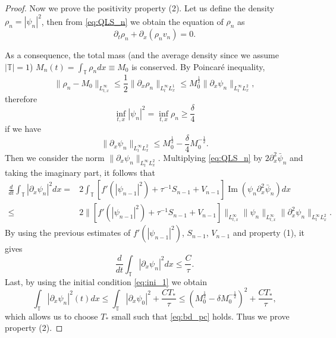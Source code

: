 \documentclass[10pt,a4paper]{amsart}
\DeclareMathOperator{\IM}{Im}
\def\T{{\mathbb T}}%
\def\d{{\partial}}
\begin{document}
\begin{proof}
Now we prove the positivity property (2). Let us define the density $\rho_n=|\psi_n|^2$, then from \eqref{eq:QLS_n} we obtain the equation of $\rho_n$ as
\[
\d_t\rho_n+\d_x (\rho_n v_n)=0.
\]

As a consequence, the total mass (and the average density since we assume $|\T|=1$) $M_n(t)=\int_\T\rho_n dx\equiv M_0$ is conserved. By Poincar\'e inequality,
\begin{equation}\label{eq:poincare}
\|\rho_n-M_0\|_{L^\infty_{t,x}}\leq \frac12\|\d_x\rho_n\|_{L^\infty_tL^1_x}\leq M_0^\frac12\|\d_x\psi_n\|_{L^\infty_tL^2_x},
\end{equation}
therefore 
\[
\inf_{t,x}|\psi_n|^2=\inf_{t,x}\rho_n\geq \frac{\delta}{4}
\]
if we have
\begin{equation}\label{eq:bd_pc}
\|\d_x\psi_n\|_{L^\infty_tL^2_x}\leq M_0^\frac12-\frac{\delta}{4}M_0^{-\frac12}.
\end{equation}
Then we consider the norm $\|\d_x\psi_n\|_{L^\infty_tL^2_x}$. Multiplying \eqref{eq:QLS_n} by $2\d_x^2\bar\psi_n$ and taking the imaginary part, it follows that
\begin{align*}
\frac{d}{dt}\int_\T|\d_x\psi_n|^2dx=&2\int_\T[f'(|\psi_{n-1}|^2)+\tau^{-1}S_{n-1}+V_{n-1}]\IM(\psi_n\d_x^2\bar\psi_n)dx\\
\leq & 2\|[f'(|\psi_{n-1}|^2)+\tau^{-1}S_{n-1}+V_{n-1}]\|_{L^\infty_{t,x}}\|\psi_n\|_{L^\infty_{t,x}}\|\d_x^2\psi_n\|_{L^\infty_tL^2_x}.
\end{align*}
By using the previous estimates of $f'(|\psi_{n-1}|^2)$, $S_{n-1}$, $V_{n-1}$ and property (1), it gives
\[
\frac{d}{dt}\int_\T|\d_x\psi_n|^2dx\leq \frac{C}{\tau}.
\]
Last, by using the initial condition \eqref{eq:ini_1} we obtain
\[
\int_\T|\d_x\psi_n|^2(t)dx\leq \int_\T|\d_x\psi_0|^2+\frac{CT_*}{\tau}\leq (M_0^\frac12-\delta M_0^{-\frac12})^2+\frac{CT_*}{\tau},
\]
which allows us to choose $T_*$ small such that \eqref{eq:bd_pc} holds. Thus we prove property (2). 


\end{proof}
\end{document}
